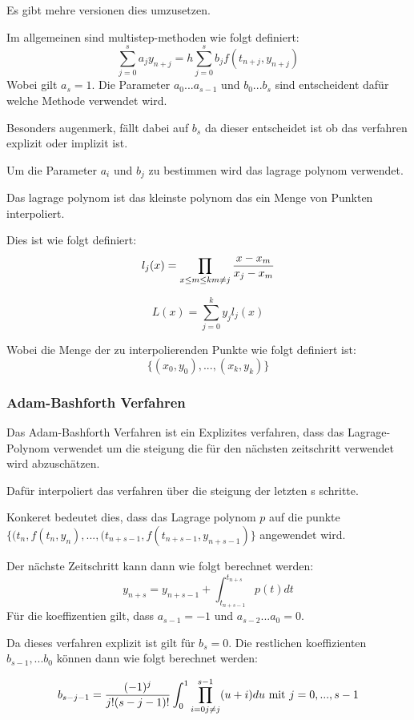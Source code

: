 Es gibt mehre versionen dies umzusetzen.

Im allgemeinen sind multistep-methoden wie folgt definiert:
$$
\sum_{j= 0}^{s} a_j y_{n+j} = h \sum_{j=0}^s b_j f(t_{n+j}, y_{n+j})
$$
Wobei gilt $a_s= 1$.  Die Parameter $a_0 ... a_{s-1}$ und $b_0 ... b_{s}$ sind entscheident dafür welche Methode verwendet wird.

Besonders augenmerk, fällt dabei auf $b_s$ da dieser entscheidet ist ob das verfahren explizit oder implizit ist.

Um die Parameter $a_i$ und $b_j$ zu bestimmen wird das lagrage polynom verwendet.

Das lagrage polynom ist das kleinste polynom das ein Menge von Punkten interpoliert.

Dies ist wie folgt definiert:
$$
l_j(x) = \prod_{x \leq m \leq k \\ m \neq j} \frac{x - x_m}{x_j - x_m}
$$

$$
L(x) = \sum_{j = 0}^{k} y_j l_j(x)
$$

Wobei die Menge der zu interpolierenden Punkte wie folgt definiert ist:
$$
\{(x_0, y_0), ..., (x_k, y_k)\}
$$

\subsubsection{Adam-Bashforth Verfahren}

Das Adam-Bashforth Verfahren ist ein Explizites verfahren, 
dass das Lagrage-Polynom verwendet um die steigung die für den nächsten zeitschritt
verwendet wird abzuschätzen. 

Dafür interpoliert das verfahren über die steigung der letzten s schritte.

Konkeret bedeutet dies, dass das Lagrage polynom $p$ auf die punkte $\{(t_{n}, f(t_{n}, y_{n}), ..., (t_{n + s - 1}, f(t_{n + s - 1}, y_{n + s - 1})\}$ angewendet wird.

Der nächste Zeitschritt kann dann wie folgt berechnet werden:
$$
y_{n + s} = y_{n + s -1} + \int_{t_{n+s-1}}^{t_{n + s}} p(t) dt
$$
Für die koeffizentien gilt, dass $a_{s-1} = -1$ und $a_{s-2} ... a_{0} = 0$. 

Da dieses verfahren explizit ist gilt für $b_s = 0$. Die restlichen koeffizienten $b_{s-1}, ... b_{0}$
können dann wie folgt berechnet werden:

$$
b_{s - j - 1} = \frac{(-1)^j}{j!(s- j -1 )!} \int_0^1 \prod_{i = 0 \\ j \neq j}^{s-1} (u + i) du \text{ mit } j = 0, ...,  s-1 
$$






